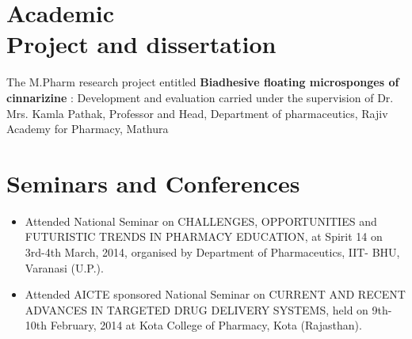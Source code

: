 \documentclass[margin,line]{res}
\begin{document}
\begin{resume}

\section{\sc Academic \\Project and dissertation}

The M.Pharm research project entitled { \bf Biadhesive ﬂoating microsponges of cinnarizine} : Development and evaluation carried under the supervision of Dr. Mrs. Kamla Pathak, Professor and Head, Department of pharmaceutics, Rajiv Academy for Pharmacy, Mathura\\



\section{\sc Seminars and Conferences}

\begin{itemize}[leftmargin=.1in]
\setlength\itemsep{-1em}

\item Attended National Seminar on CHALLENGES, OPPORTUNITIES and FUTURISTIC TRENDS IN PHARMACY EDUCATION, at Spirit 14 on 3rd-4th March, 2014, organised by Department of Pharmaceutics, IIT- BHU, Varanasi (U.P.).\\
\item Attended AICTE sponsored National Seminar on CURRENT AND RECENT ADVANCES IN TARGETED DRUG DELIVERY SYSTEMS, held on  9th-10th February, 2014 at Kota College of Pharmacy, Kota (Rajasthan).

\end{itemize}



\end{resume}
\end{document}
